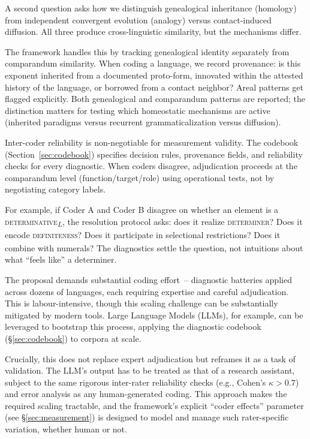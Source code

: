 \documentclass[12pt]{article}
\begin{document}
A second question asks how we distinguish genealogical inheritance (homology) from independent convergent evolution (analogy) versus contact-induced diffusion. All three produce cross-linguistic similarity, but the mechanisms differ.

The framework handles this by tracking genealogical identity separately from comparandum similarity. When coding a language, we record provenance: is this exponent inherited from a documented proto-form, innovated within the attested history of the language, or borrowed from a contact neighbor? Areal patterns get flagged explicitly. Both genealogical and comparandum patterns are reported; the distinction matters for testing which homeostatic mechanisms are active (inherited paradigms versus recurrent grammaticalization versus diffusion).

Inter-coder reliability is non-negotiable for measurement validity. The codebook (Section~\ref{sec:codebook}) specifies decision rules, provenance fields, and reliability checks for every diagnostic. When coders disagree, adjudication proceeds at the comparandum level (function/target/role) using operational tests, not by negotiating category labels.

For example, if Coder A and Coder B disagree on whether an element is a \textsc{determinative}\textsubscript{$L$}, the resolution protocol asks: does it realize \textsc{determiner}\textsubscript{\Cross}? Does it encode \textsc{definiteness}\textsubscript{\Cross}? Does it participate in selectional restrictions? Does it combine with numerals? The diagnostics settle the question, not intuitions about what \enquote{feels like} a determiner.

The proposal demands substantial coding effort~-- diagnostic batteries applied across dozens of languages, each requiring expertise and careful adjudication. This is labour-intensive, though this scaling challenge can be substantially mitigated by modern tools. Large Language Models (LLMs), for example, can be leveraged to bootstrap this process, applying the diagnostic codebook (\S\ref{sec:codebook}) to corpora at scale.

Crucially, this does not replace expert adjudication but reframes it as a task of validation. The LLM's output has to be treated as that of a research assistant, subject to the same rigorous inter-rater reliability checks (e.g., Cohen's $\kappa > 0.7$) and error analysis as any human-generated coding. This approach makes the required scaling tractable, and the framework's explicit \enquote{coder effects} parameter (see \S\ref{sec:measurement}) is designed to model and manage such rater-specific variation, whether human or not.
\end{document}
